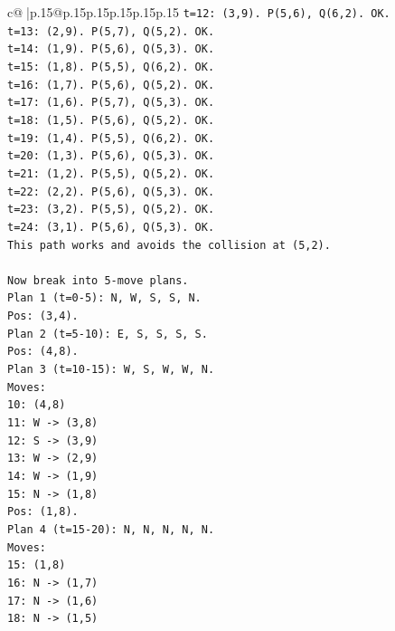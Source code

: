 \documentclass{article}
\begin{document}
{\begin{supertabular}{c@{$\;$}|p{.15\linewidth}@{}p{.15\linewidth}p{.15\linewidth}p{.15\linewidth}p{.15\linewidth}p{.15\linewidth}}
{{{\texttt{t=12: (3,9). P(5,6), Q(6,2). OK.} \\
\texttt{t=13: (2,9). P(5,7), Q(5,2). OK.} \\
\texttt{t=14: (1,9). P(5,6), Q(5,3). OK.} \\
\texttt{t=15: (1,8). P(5,5), Q(6,2). OK.} \\
\texttt{t=16: (1,7). P(5,6), Q(5,2). OK.} \\
\texttt{t=17: (1,6). P(5,7), Q(5,3). OK.} \\
\texttt{t=18: (1,5). P(5,6), Q(5,2). OK.} \\
\texttt{t=19: (1,4). P(5,5), Q(6,2). OK.} \\
\texttt{t=20: (1,3). P(5,6), Q(5,3). OK.} \\
\texttt{t=21: (1,2). P(5,5), Q(5,2). OK.} \\
\texttt{t=22: (2,2). P(5,6), Q(5,3). OK.} \\
\texttt{t=23: (3,2). P(5,5), Q(5,2). OK.} \\
\texttt{t=24: (3,1). P(5,6), Q(5,3). OK.} \\
\texttt{This path works and avoids the collision at (5,2).} \\
\\ 
\texttt{Now break into 5{-}move plans.} \\
\texttt{Plan 1 (t=0{-}5): N, W, S, S, N.} \\
\texttt{Pos: (3,4).} \\
\texttt{Plan 2 (t=5{-}10): E, S, S, S, S.} \\
\texttt{Pos: (4,8).} \\
\texttt{Plan 3 (t=10{-}15): W, S, W, W, N.} \\
\texttt{Moves:} \\
\texttt{10: (4,8)} \\
\texttt{11: W {-}> (3,8)} \\
\texttt{12: S {-}> (3,9)} \\
\texttt{13: W {-}> (2,9)} \\
\texttt{14: W {-}> (1,9)} \\
\texttt{15: N {-}> (1,8)} \\
\texttt{Pos: (1,8).} \\
\texttt{Plan 4 (t=15{-}20): N, N, N, N, N.} \\
\texttt{Moves:} \\
\texttt{15: (1,8)} \\
\texttt{16: N {-}> (1,7)} \\
\texttt{17: N {-}> (1,6)} \\
\texttt{18: N {-}> (1,5)} \\
}}}
\end{supertabular}}
\end{document}
